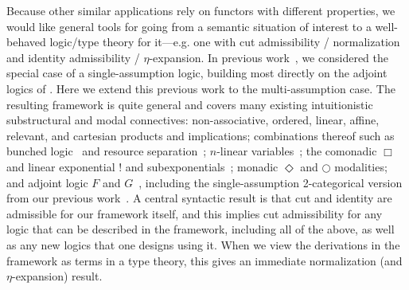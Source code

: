 Because other similar applications rely on functors with different
properties, we would like general tools for going from a semantic
situation of interest to a well-behaved logic/type theory for
it---e.g. one with cut admissibility / normalization and identity
admissibility / $\eta$-expansion.  In previous work~\citep{ls16adjoint},
we considered the special case of a single-assumption logic, building
most directly on the adjoint logics of
\citet{benton94mixed,bentonwadler96adjoint,reed09adjoint}.  Here we
extend this previous work to the multi-assumption case.  The resulting
framework is quite general and covers many existing intuitionistic
substructural and modal connectives: non-associative, ordered, linear,
affine, relevant, and cartesian products and implications; combinations
thereof such as bunched logic~\citep{ohearnpym99bunched} and resource
separation~\citep{atkey04separation}; $n$-linear
variables~\citep{reed08namessubstructural,abel15modal,mcbride16nuttin};
the comonadic $\Box$ and linear exponential $!$ and
subexponentials~\citep{nigammiller09subexponentials,danos+93subexponentials};
monadic $\Diamond$ and $\bigcirc$ modalities; and adjoint logic $F$ and
$G$~\citep{benton94mixed,bentonwadler96adjoint,reed09adjoint}, including
the single-assumption 2-categorical version from our previous
work~\citep{ls16adjoint}.  A central syntactic result is that cut and
identity are admissible for our framework itself, and this implies cut
admissibility for any logic that can be described in the framework,
including all of the above, as well as any new logics that one designs
using it.  When we view the derivations in the framework as terms in a
type theory, this gives an immediate normalization (and
$\eta$-expansion) result.

